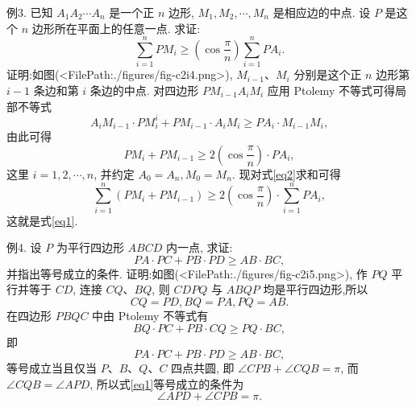 例3. 已知 $A_1 A_2 \cdots A_n$ 是一个正 $n$ 边形, $M_1, M_2, \cdots, M_n$ 是相应边的中点.
设 $P$ 是这个 $n$ 边形所在平面上的任意一点.
求证:
$$
\sum_{i=1}^n P M_i \geqslant\left(\cos \frac{\pi}{n}\right) \sum_{i=1}^n P A_i . \label{eq1}
$$
证明:如图(<FilePath:./figures/fig-c2i4.png>), $M_{i-1} 、 M_i$ 分别是这个正 $n$ 边形第 $i-1$ 条边和第 $i$ 条边的中点.
对四边形 $P M_{i-1} A_i M_i$ 应用 Ptolemy 不等式可得局部不等式
$$
A_i M_{i-1} \cdot P M_i^i+P M_{i-1} \cdot A_i M_i \geqslant P A_i \cdot M_{i-1} M_i,
$$
由此可得
$$
P M_i+P M_{i-1} \geqslant 2\left(\cos \frac{\pi}{n}\right) \cdot P A_i, \label{eq2}
$$
这里 $i=1,2, \cdots, n$, 并约定 $A_0=A_n, M_0=M_n$.
现对式\ref{eq2}求和可得
$$
\sum_{i=1}^n\left(P M_i+P M_{i-1}\right) \geqslant 2\left(\cos \frac{\pi}{n}\right) \cdot \sum_{i=1}^n P A_i,
$$
这就是式\ref{eq1}.



例4. 设 $P$ 为平行四边形 $A B C D$ 内一点, 求证:
$$
P A \cdot P C+P B \cdot P D \geqslant A B \cdot B C, \label{eq1}
$$
并指出等号成立的条件.
证明:如图(<FilePath:./figures/fig-c2i5.png>), 作 $P Q$ 平行并等于 $C D$, 连接 $C Q 、 B Q$, 则 $C D P Q$ 与 $A B Q P$ 均是平行四边形,所以
$$
C Q=P D, B Q=P A, P Q=A B .
$$
在四边形 $P B Q C$ 中由 Ptolemy 不等式有
$$
B Q \cdot P C+P B \cdot C Q \geqslant P Q \cdot B C,
$$
即
$$
P A \cdot P C+P B \cdot P D \geqslant A B \cdot B C,
$$
等号成立当且仅当 $P 、 B 、 Q 、 C$ 四点共圆, 即 $\angle C P B+\angle C Q B=\pi$, 而 $\angle C Q B=\angle A P D$, 所以式\ref{eq1}等号成立的条件为
$$
\angle A P D+\angle C P B=\pi .
$$



